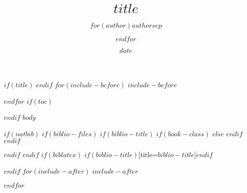 \documentclass[professionalfont, 12pt, dvipdfmx, default, cjk]{beamer}
\title{$title$}
\author{$for(author)$$author$$sep$ \and $endfor$}
\date{$date$}
\begin{document}
$if(title)$
\frame{\titlepage}
$endif$
$for(include-before)$
$include-before$

$endfor$
$if(toc)$
\begin{frame}
\tableofcontents[hideallsubsections]
\end{frame}

$endif$
$body$

$if(natbib)$
$if(biblio-files)$
$if(biblio-title)$
$if(book-class)$
\renewcommand\bibname{$biblio-title$}
$else$
\renewcommand\refname{$biblio-title$}
$endif$
$endif$


$endif$
$endif$
$if(biblatex)$
\printbibliography$if(biblio-title)$[title=$biblio-title$]$endif$

$endif$
$for(include-after)$
$include-after$

$endfor$
\end{document}
